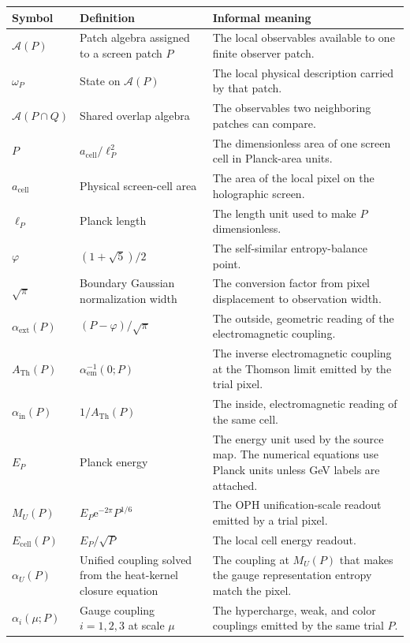 \documentclass[11pt]{article}
\theoremstyle{remark}
\newcommand{\A}{\mathcal A}
\newcommand{\e}{\mathrm e}
\newcommand{\ATh}{A_{\mathrm{Th}}}
\begin{document}
\begin{longtable}{@{}L{0.20\textwidth}L{0.32\textwidth}L{0.38\textwidth}@{}}
\toprule
Symbol & Definition & Informal meaning \\
\midrule
\endhead
\(\A(P)\) & Patch algebra assigned to a screen patch \(P\) & The local observables available to one finite observer patch. \\
\(\omega_P\) & State on \(\A(P)\) & The local physical description carried by that patch. \\
\(\A(P\cap Q)\) & Shared overlap algebra & The observables two neighboring patches can compare. \\
\(P\) & \(a_{\mathrm{cell}}/\ell_P^2\) & The dimensionless area of one screen cell in Planck-area units. \\
\(a_{\mathrm{cell}}\) & Physical screen-cell area & The area of the local pixel on the holographic screen. \\
\(\ell_P\) & Planck length & The length unit used to make \(P\) dimensionless. \\
\(\varphi\) & \((1+\sqrt5)/2\) & The self-similar entropy-balance point. \\
\(\sqrt\pi\) & Boundary Gaussian normalization width & The conversion factor from pixel displacement to observation width. \\
\(\alpha_{\mathrm{ext}}(P)\) & \((P-\varphi)/\sqrt\pi\) & The outside, geometric reading of the electromagnetic coupling. \\
\(\ATh(P)\) & \(\alpha_{\mathrm{em}}^{-1}(0;P)\) & The inverse electromagnetic coupling at the Thomson limit emitted by the trial pixel. \\
\(\alpha_{\mathrm{in}}(P)\) & \(1/\ATh(P)\) & The inside, electromagnetic reading of the same cell. \\
\(E_P\) & Planck energy & The energy unit used by the source map. The numerical equations use Planck units unless GeV labels are attached. \\
\(M_U(P)\) & \(E_P\e^{-2\pi}P^{1/6}\) & The OPH unification-scale readout emitted by a trial pixel. \\
\(E_{\mathrm{cell}}(P)\) & \(E_P/\sqrt P\) & The local cell energy readout. \\
\(\alpha_U(P)\) & Unified coupling solved from the heat-kernel closure equation & The coupling at \(M_U(P)\) that makes the gauge representation entropy match the pixel. \\
\(\alpha_i(\mu;P)\) & Gauge coupling \(i=1,2,3\) at scale \(\mu\) & The hypercharge, weak, and color couplings emitted by the same trial \(P\). \\

\end{longtable}
\end{document}
